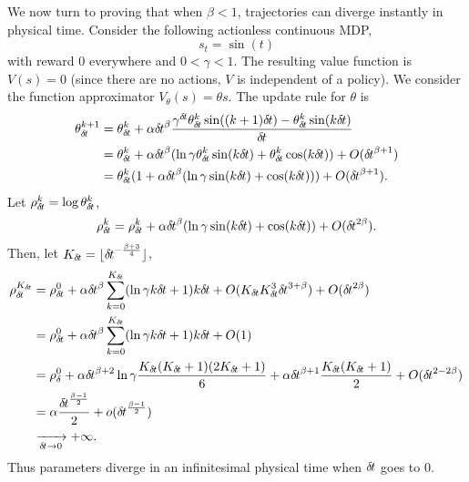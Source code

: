 We now turn to proving that when $\beta < 1$,
trajectories can diverge instantly in physical time. 
Consider the following actionless continuous MDP, 
\begin{equation}
	s_t = \sin(t)
\end{equation}
with reward $0$ everywhere and $0 < \gamma < 1$.
The resulting value function is $V(s) = 0$ (since there
are no actions, $V$ is independent of a policy).
We consider the function approximator $V_\theta(s) = \theta s$.
The update rule for $\theta$ is
\begin{align}
	\theta_\deltat^{k+1} &= \theta_\deltat^k + \alpha \deltat^\beta \frac{\gamma^\deltat \theta_\deltat^k \sin((k + 1) \deltat) - \theta_\deltat^k \sin(k\deltat)}{\deltat}\\
			     &= \theta_\deltat^k + \alpha \deltat^\beta (\ln \gamma \theta_\deltat^k \sin(k \deltat) + \theta_\deltat^k \cos(k \deltat)) + \bigO(\deltat^{\beta + 1})\\
			     &= \theta_\deltat^k(1 + \alpha \deltat^\beta (\ln \gamma \sin(k \deltat) + \cos(k \deltat))) + \bigO(\deltat^{\beta + 1}).
\end{align}
Let $\rho_{\delta\hspace{-.1em}t}^k = \log \theta_{\delta\hspace{-.1em}t}^k$,
\begin{align}
	\rho_{\delta\hspace{-.1em}t}^k = \rho_{\delta\hspace{-.1em}t}^k + \alpha {\delta\hspace{-.1em}t}^\beta (\ln \gamma \sin(k {\delta\hspace{-.1em}t}) + \cos(k {\delta\hspace{-.1em}t})) + O({\delta\hspace{-.1em}t}^{2\beta}).
\end{align}
Then, let $K_{\delta\hspace{-.1em}t} = \lfloor {\delta\hspace{-.1em}t}^{-\frac{\beta + 3}{4}}\rfloor$,
\begin{align}
	\rho_\deltat^{K_\deltat} &= \rho_\deltat^0 + \alpha \deltat^\beta \sum\limits_{k=0}^{K_\deltat} (\ln \gamma k\deltat + 1)k\deltat + \bigO(K_\deltat K_\deltat^3 \deltat^{3 + \beta}) + \bigO(\deltat^{2\beta})\\
				 &= \rho_\deltat^0 + \alpha \deltat^\beta \sum\limits_{k=0}^{K_\deltat} (\ln \gamma k\deltat + 1)k\deltat + \bigO(1)\\
				 &= \rho_\delta^0 + \alpha\deltat^{\beta + 2} \ln\gamma \frac{K_\deltat (K_\deltat + 1) (2 K_\deltat + 1)}{6} + \alpha \deltat^{\beta + 1} \frac{K_\deltat (K_\deltat + 1)}{2} + \bigO(\deltat^{2 - 2 \beta})\\
				 &= \alpha \frac{\deltat^{\frac{\beta - 1}{2}}}{2} + \smallo(\deltat^{\frac{\beta - 1}{2}})\\
				 &\xrightarrow[\deltat\to 0]{} +\infty.
\end{align}
Thus parameters diverge in an infinitesimal physical time when ${\delta\hspace{-.1em}t}$ goes to $0$.

